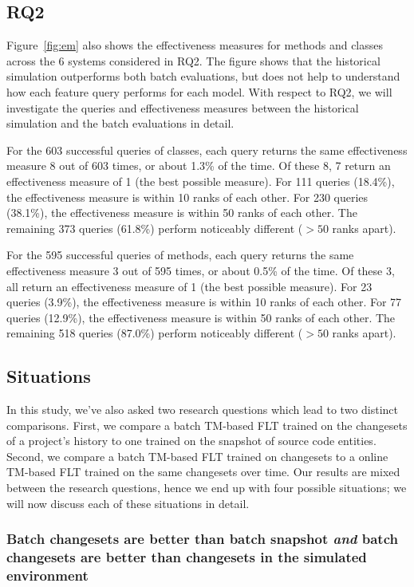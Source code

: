 \subsection{RQ2}

Figure~\ref{fig:em} also shows the effectiveness measures for methods and
classes across the 6 systems considered in RQ2. The figure shows that the
historical simulation outperforms both batch evaluations, but does not help to
understand how each feature query performs for each model.  With respect to RQ2,
we will investigate the queries and effectiveness measures between the
historical simulation and the batch evaluations in detail.

For the 603 successful queries of classes, each query returns the same
effectiveness measure 8 out of 603 times, or about 1.3\% of the time.  Of these
8, 7 return an effectiveness measure of 1 (the best possible measure).  For 111
queries (18.4\%), the effectiveness measure is within 10 ranks of each other.
For 230 queries (38.1\%), the effectiveness measure is within 50 ranks of each
other.  The remaining 373 queries (61.8\%) perform noticeably different ($> 50$
ranks apart).

For the 595 successful queries of methods, each query returns the same
effectiveness measure 3 out of 595 times, or about 0.5\% of the time.  Of these
3, all return an effectiveness measure of 1 (the best possible measure).  For 23
queries (3.9\%), the effectiveness measure is within 10 ranks of each other.
For 77 queries (12.9\%), the effectiveness measure is within 50 ranks of each
other.  The remaining 518 queries (87.0\%) perform noticeably different ($> 50$
ranks apart).

\subsection{Situations}


In this study, we've also asked two research questions which lead to two
distinct comparisons.  First, we compare a batch TM-based FLT trained on the
changesets of a project's history to one trained on the snapshot of source code
entities.  Second, we compare a batch TM-based FLT trained on changesets to a
online TM-based FLT trained on the same changesets over time.  Our results are
mixed between the research questions, hence we end up with four possible
situations; we will now discuss each of these situations in detail.

\subsubsection{Batch changesets are better than batch snapshot
\emph{and} batch changesets are better than changesets in the simulated environment}

